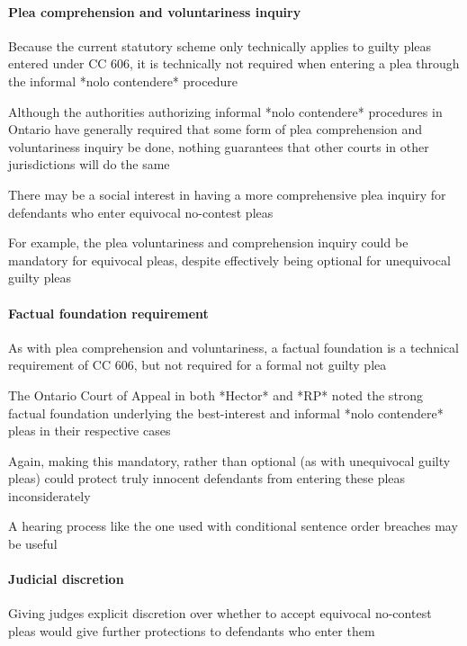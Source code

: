 \paragraph{Plea comprehension and voluntariness inquiry\\}

Because the current statutory scheme only technically applies to guilty pleas entered under CC 606, it is technically not required when entering a plea through the informal *nolo contendere* procedure

Although the authorities authorizing informal *nolo contendere* procedures in Ontario have generally required that some form of plea comprehension and voluntariness inquiry be done, nothing guarantees that other courts in other jurisdictions will do the same

There may be a social interest in having a more comprehensive plea inquiry for defendants who enter equivocal no-contest pleas

For example, the plea voluntariness and comprehension inquiry could be mandatory for equivocal pleas, despite effectively being optional for unequivocal guilty pleas

\paragraph{Factual foundation requirement\\}

As with plea comprehension and voluntariness, a factual foundation is a technical requirement of CC 606, but not required for a formal not guilty plea

The Ontario Court of Appeal in both *Hector* and *RP* noted the strong factual foundation underlying the best-interest and informal *nolo contendere* pleas in their respective cases

Again, making this mandatory, rather than optional (as with unequivocal guilty pleas) could protect truly innocent defendants from entering these pleas inconsiderately

A hearing process like the one used with conditional sentence order breaches may be useful

\paragraph{Judicial discretion\\}

Giving judges explicit discretion over whether to accept equivocal no-contest pleas would give further protections to defendants who enter them

